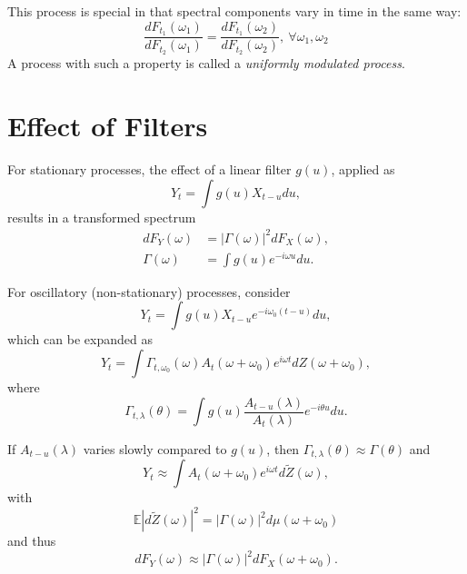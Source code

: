 \documentclass[12pt]{article}
\theoremstyle{definition}
\theoremstyle{plain}
\theoremstyle{remark}
\begin{document}
This process is special in that spectral components vary in time in the same way:
\begin{equation}
\frac{dF_{t_1}(\omega_1)}{dF_{t_2}(\omega_1)} = \frac{dF_{t_1}(\omega_2)}{dF_{t_2}(\omega_2)},~\forall \omega_1, \omega_2
\end{equation}
A process with such a property is called a \emph{uniformly modulated process}.

\section{Effect of Filters}
\label{sec:filters}

For stationary processes, the effect of a linear filter $g(u)$, applied as
\begin{equation}
Y_t = \int g(u) X_{t-u} du,
\label{eq:filter}
\end{equation}
results in a transformed spectrum
\begin{align}
dF_Y(\omega) &= |\Gamma(\omega)|^2 dF_X(\omega), \label{eq:filtered_spec}\\
\Gamma(\omega) &= \int g(u) e^{-i\omega u} du.
\end{align}

For oscillatory (non-stationary) processes, consider
\begin{equation}
Y_t = \int g(u) X_{t-u} e^{-i\omega_0 (t-u)} du,
\label{eq:nonstationary_filter}
\end{equation}
which can be expanded as
\begin{equation}
Y_t = \int \Gamma_{t,\omega_0}(\omega) A_{t}(\omega + \omega_0) e^{i\omega t} dZ(\omega + \omega_0), 
\label{eq:filtered_oscillatory}
\end{equation}
where
\begin{equation}
\Gamma_{t,\lambda}(\theta) = \int g(u) \frac{A_{t-u}(\lambda)}{A_t(\lambda)} e^{-i\theta u} du.
\label{eq:gen_transfer}
\end{equation}

If $A_{t-u}(\lambda)$ varies slowly compared to $g(u)$, then $\Gamma_{t,\lambda}(\theta) \approx \Gamma(\theta)$ and
\begin{equation}
Y_t \approx \int A_t(\omega + \omega_0) e^{i\omega t} d\widetilde{Z}(\omega),
\end{equation}
with
\begin{equation}
\mathbb{E}|d\widetilde{Z}(\omega)|^2 = |\Gamma(\omega)|^2 d\mu(\omega + \omega_0)
\end{equation}
and thus
\begin{equation}
dF_Y(\omega) \approx |\Gamma(\omega)|^2 dF_X(\omega + \omega_0).
\label{eq:filtered_evospectra}
\end{equation}
\end{document}
